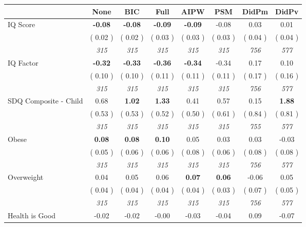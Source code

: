 \begin{tabular}{l c c c c c c c}
\toprule
 & None & BIC & Full & AIPW & PSM & DidPm & DidPv \\
\midrule
IQ Score & \textbf{     -0.08 } & \textbf{     -0.08 } & \textbf{     -0.09 } & \textbf{    -0.09} &     -0.08 &      0.03 &      0.01 \\
& (     0.02 ) & (     0.02 ) & (     0.03 ) & (     0.03 ) & (     0.03 ) & (     0.04 ) & (     0.04 ) \\
& \textit{ 315 } & \textit{ 315 } & \textit{ 315 } & \textit{ 315 } & \textit{ 315 } & \textit{ 756 } & \textit{ 577 } \\
IQ Factor & \textbf{     -0.32 } & \textbf{     -0.33 } & \textbf{     -0.36 } & \textbf{    -0.34} &     -0.34 &      0.17 &      0.10 \\
& (     0.10 ) & (     0.10 ) & (     0.11 ) & (     0.11 ) & (     0.11 ) & (     0.17 ) & (     0.16 ) \\
& \textit{ 315 } & \textit{ 315 } & \textit{ 315 } & \textit{ 315 } & \textit{ 315 } & \textit{ 756 } & \textit{ 577 } \\
SDQ Composite - Child &      0.68 & \textbf{      1.02 } & \textbf{      1.33 } &      0.41 &      0.57 &      0.15 & \textbf{      1.88 } \\
& (     0.53 ) & (     0.53 ) & (     0.52 ) & (     0.50 ) & (     0.61 ) & (     0.84 ) & (     0.81 ) \\
& \textit{ 315 } & \textit{ 315 } & \textit{ 315 } & \textit{ 315 } & \textit{ 315 } & \textit{ 755 } & \textit{ 577 } \\
Obese & \textbf{      0.08 } & \textbf{      0.08 } & \textbf{      0.10 } &      0.05 &      0.03 &      0.03 &     -0.03 \\
& (     0.05 ) & (     0.06 ) & (     0.06 ) & (     0.08 ) & (     0.06 ) & (     0.08 ) & (     0.08 ) \\
& \textit{ 315 } & \textit{ 315 } & \textit{ 315 } & \textit{ 315 } & \textit{ 315 } & \textit{ 756 } & \textit{ 577 } \\
Overweight &      0.04 &      0.05 &      0.06 & \textbf{     0.07} & \textbf{     0.06} &     -0.06 &      0.05 \\
& (     0.04 ) & (     0.04 ) & (     0.04 ) & (     0.04 ) & (     0.03 ) & (     0.07 ) & (     0.05 ) \\
& \textit{ 315 } & \textit{ 315 } & \textit{ 315 } & \textit{ 315 } & \textit{ 315 } & \textit{ 756 } & \textit{ 577 } \\
Health is Good &     -0.02 &     -0.02 &     -0.00 &     -0.03 &     -0.04 &      0.09 &     -0.07 \\

\end{tabular}
